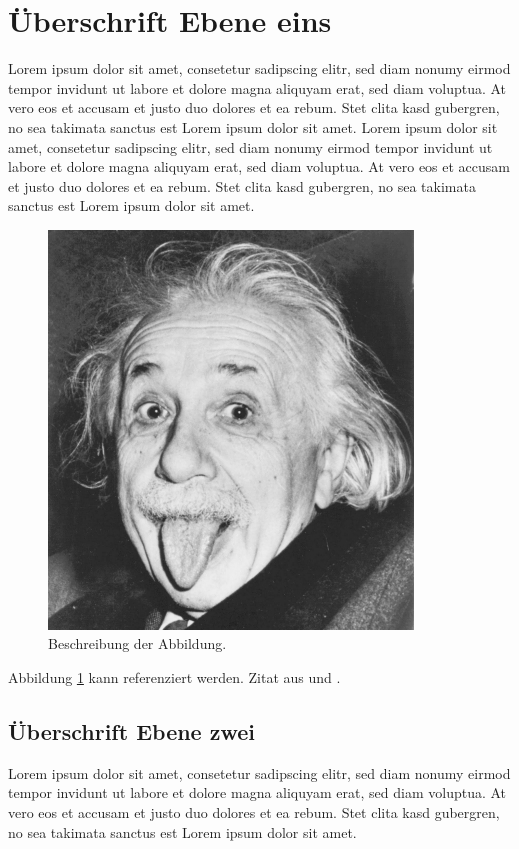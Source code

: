 \section{Überschrift Ebene eins}

Lorem ipsum dolor sit amet, consetetur sadipscing elitr, sed diam nonumy eirmod tempor invidunt ut labore et dolore magna aliquyam erat, sed diam voluptua. At vero eos et accusam et justo duo dolores et ea rebum. Stet clita kasd gubergren, no sea takimata sanctus est Lorem ipsum dolor sit amet. Lorem ipsum dolor sit amet, consetetur sadipscing elitr, sed diam nonumy eirmod tempor invidunt ut labore et dolore magna aliquyam erat, sed diam voluptua. At vero eos et accusam et justo duo dolores et ea rebum. Stet clita kasd gubergren, no sea takimata sanctus est Lorem ipsum dolor sit amet.

\begin{figure}[htbp]
\centering
\includegraphics[scale=0.5]{einstein}
\caption{Beschreibung der Abbildung.}
\label{abb_einstein}
\end{figure}

Abbildung \ref{abb_einstein} kann referenziert werden. Zitat aus \cite{scheme} und \cite[17]{knuth}.

\subsection{Überschrift Ebene zwei}

Lorem ipsum dolor sit amet, consetetur sadipscing elitr, sed diam nonumy eirmod tempor invidunt ut labore et dolore magna aliquyam erat, sed diam voluptua. At vero eos et accusam et justo duo dolores et ea rebum. Stet clita kasd gubergren, no sea takimata sanctus est Lorem ipsum dolor sit amet.

